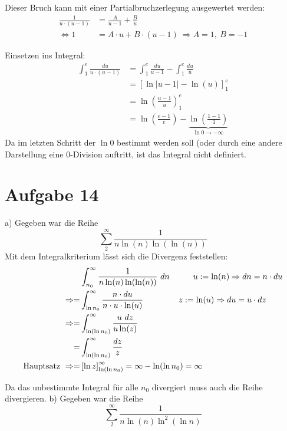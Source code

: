 \documentclass[10pt]{article}
\begin{document}
Dieser Bruch kann mit einer Partialbruchzerlegung ausgewertet werden:
\begin{align*}
	\frac{1}{u \cdot (u-1)} &= \frac{A}{u-1} + \frac{B}{u} \\
	\Leftrightarrow
	1 &= A \cdot u + B \cdot (u-1) \ \Rightarrow
	A = 1, \ B = -1
\end{align*}

Einsetzen ins Integral:
\begin{align*}
	\int_1^e \frac{du}{u \cdot (u-1)} 
	&= 
	\int_1^e \frac{du}{u-1} - \int_1^e \frac{du}{u}  \\
	&= \left[ \ln\vert u-1 \vert - \ln(u) \right]_1^e \\
	&= \ln\left(\frac{u-1}{u}\right)_1^e \\
	&= \ln\left(\frac{e-1}{e}\right) -
	\underbrace{\ln\left(\frac{1-1}{1}\right)}_{\ln0 \rightarrow -\infty}
\end{align*}
Da im letzten Schritt der $\ln 0$ bestimmt werden soll (oder durch eine 
andere Darstellung eine 0-Division auftritt, ist das Integral nicht 
definiert.



\section*{Aufgabe 14}

a) Gegeben war die Reihe
\[
	\sum_2^\infty \frac{1}{n \ln(n) \ln(\ln(n))}
\]
Mit dem Integralkriterium lässt sich die Divergenz feststellen:
\begin{align*}
	&\int_{n_0}^\infty \frac{1}{n \ln(n) \ln(\ln(n))} \ dn \hspace{1cm}
	u := \ln(n) \Rightarrow dn = n \cdot du \\
	\Rightarrow 
	= &\int_{\ln n_0}^\infty \frac{n \cdot du}{n \cdot u \cdot \ln(u)} 
	\hspace{1.5cm} z := \ln(u) \Rightarrow du = u \cdot dz \\
	\Rightarrow
	= &\int_{\ln(\ln n_0)}^\infty \frac{u \ dz}{u \ln(z)} \\
	= &\int_{\ln(\ln n_0)}^\infty \frac{dz}{z} \\
	\text{Hauptsatz } \Rightarrow =
	& \left[\ln z \right]_{\ln(\ln n_0)}^\infty = \infty - \ln(\ln n_0)
	= \infty
\end{align*}

Da das unbestimmte Integral für alle $n_0$ divergiert muss auch die Reihe 
divergieren. \newline
\vspace{0.5cm}
\newline
\newpage
b) Gegeben war die Reihe 
\[
	\sum_2^\infty \frac1{n \ln(n) \ln^2(\ln n)}
\]
\end{document}
